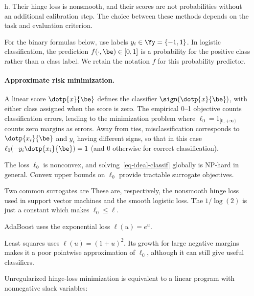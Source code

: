 h. Their hinge loss is nonsmooth, and their scores are not probabilities without an additional calibration step. The choice between these methods depends on the task and evaluation criterion.

For the binary formulas below, use labels $y_i \in \Yy = \{-1,1\}$. In logistic classification, the prediction $f(\cdot,\be) \in [0,1]$ is a probability for the positive class rather than a class label. We retain the notation $f$ for this probability predictor.


    
\paragraph{Approximate risk minimization.}

A linear score $\dotp{x}{\be}$ defines the classifier $\sign(\dotp{x}{\be})$, with either class assigned when the score is zero. The empirical 0--1 objective counts classification errors, leading to the minimization problem
where $\ell_0=1_{[0,+\infty)}$ counts zero margins as errors. Away from ties, misclassification corresponds to $\dotp{x_i}{\be}$ and $y_i$ having different signs, so that in this case $\ell_0(-y_i \dotp{x_i}{\be})=1$ (and 0 otherwise for correct classification).

The loss $\ell_0$ is nonconvex, and solving~\eqref{eq-ideal-classif} globally is NP-hard in general. Convex upper bounds on $\ell_0$ provide tractable surrogate objectives.

Two common surrogates are
These are, respectively, the nonsmooth hinge loss used in support vector machines and the smooth logistic loss. The $1/\log(2)$ is just a constant which makes $\ell_0 \leq \ell$.
  
AdaBoost uses the exponential loss $\ell(u)=e^u$.
 
Least squares uses $\ell(u)=(1+u)^2$. Its growth for large negative margins makes it a poor pointwise approximation of $\ell_0$, although it can still give useful classifiers.
  
Unregularized hinge-loss minimization is equivalent to a linear program with nonnegative slack variables:


